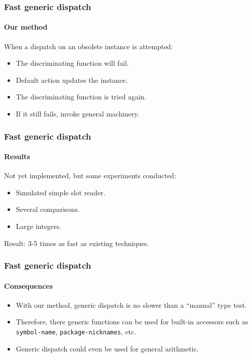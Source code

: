 \documentclass{beamer}
\begin{document}
\begin{frame}
  \frametitle{Fast generic dispatch}
  \framesubtitle{Our method}

  When a dispatch on an obsolete instance is attempted:

  \begin{itemize}
  \item The discriminating function will fail.
  \item Default action updates the instance. 
  \item The discriminating function is tried again.
  \item If it still fails, invoke general machinery.
  \end{itemize}

\end{frame}
\begin{frame}
  \frametitle{Fast generic dispatch}
  \framesubtitle{Results}

  Not yet implemented, but some experiments conducted:

  \begin{itemize}
  \item Simulated simple slot reader.
  \item Several comparisons.
  \item Large integers.
  \end{itemize}

Result: 3-5 times as fast as existing techniques.

\end{frame}
\begin{frame}
  \frametitle{Fast generic dispatch}
  \framesubtitle{Consequences}

  \begin{itemize}
  \item With our method, generic dispatch is no slower than
    a ``manual'' type test.
  \item Therefore, there generic functions can be used for built-in
    accessors such as \texttt{symbol-name},
    \texttt{package-nicknames}, etc.
  \item Generic dispatch could even be used for general arithmetic.
  \end{itemize}

\end{frame}
\end{document}

